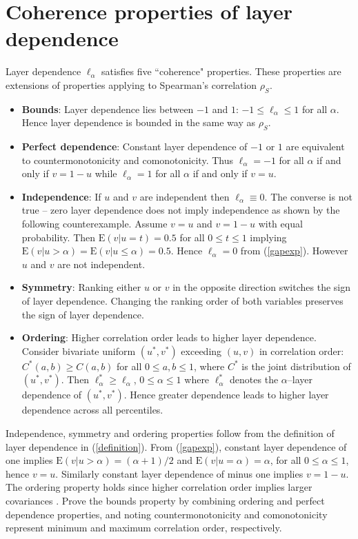 \documentclass[authoryear]{elsarticle}
\newcommand{\E}{{\mathrm E}}
\newcommand{\eref}[1]{(\ref{#1})}
\begin{document}
\section{Coherence properties of layer dependence}\label{scoherence}


Layer dependence $\ell_\alpha$ satisfies five ``coherence" properties. These properties are  extensions of  properties applying to Spearman's correlation $\rho_S$.
\begin{itemize}

\item \textbf{Bounds}: Layer dependence lies between $-1$ and $1$: $-1 \le\ell_\alpha \le 1$ for all $\alpha$.
Hence layer dependence is bounded in the same way as  $\rho_S$.

\item \textbf{Perfect dependence}: Constant layer dependence of $-1$ or $1$ are equivalent to countermonotonicity and comonotonicity.
Thus $\ell_\alpha=-1$ for all $\alpha$ if and only if  $v=1-u$ while $\ell_\alpha=1$ for all $\alpha$ if and only if  $v=u$.

\item \textbf{Independence}: If $u$ and $v$ are independent then $\ell_\alpha\equiv 0$.   The converse is not true -- zero layer dependence does not imply independence as shown by the following counterexample. Assume $v=u$ and $v=1-u$ with equal probability. Then $\E(v|u=t)=0.5$ for all $0\leq t\leq 1$ implying $\E(v|u>\alpha)=\E(v|u\leq\alpha)=0.5$. Hence $\ell_\alpha=0$ from \eref{gapexp}. However $u$ and $v$ are not independent.

\item \textbf{Symmetry}: Ranking either $u$ or $v$ in the opposite direction switches the sign of layer dependence. Changing the ranking order of both variables preserves the sign of layer dependence.

\item \textbf{Ordering}: Higher correlation order \citep{dhaene2009correlation} leads to higher layer dependence. Consider bivariate uniform $(u^*,v^*)$ exceeding $(u,v)$ in correlation order: $C^*(a,b)\geq C(a,b)$ for all $0\leq a,b\leq 1$, where $C^*$ is the joint distribution of $(u^*,v^*)$. Then
$
\ell^*_\alpha \geq \ell_\alpha$,   $0\leq\alpha\leq 1$
where $\ell_\alpha^*$ denotes the $\alpha$--layer dependence of $(u^*,v^*)$. Hence greater dependence leads to higher layer dependence across all percentiles.

\end{itemize}
Independence, symmetry and ordering properties follow from the definition of layer dependence in \eref{definition}. From \eref{gapexp}, constant layer dependence of one implies $\E(v|u>\alpha)=(\alpha+1)/2$ and $\E(v|u=\alpha)=\alpha$, for all $0\leq\alpha\leq 1$, hence $v=u$. Similarly constant layer dependence of minus one implies $v=1-u$. The ordering property holds since higher correlation order implies larger covariances \citep{dhaene2009correlation}. Prove the bounds property by combining ordering and perfect dependence properties, and noting countermonotonicity and comonotonicity represent minimum and maximum correlation order, respectively.
\end{document}
